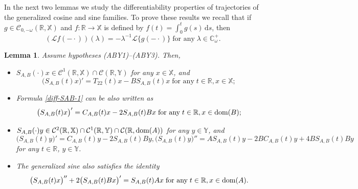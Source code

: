 \documentclass[11pt]{amsart}
\numberwithin{equation}{section}
\newcommand{\SAB}{S_{A,B}}
\newcommand{\CAB}{C_{A,B}}
\newcommand{\RR}{{\mathbb R}}
\newcommand{\CC}{{\mathbb C}}
\newcommand{\rmd}{{\mathrm{d}}}
\newtheorem{lemma}[theorem]{Lemma}
\theoremstyle{remark}
\theoremstyle{definition}
\newcommand\bX{{\mathbb X}}
\newcommand\bY{{\mathbb Y}}
\newcommand{\dom}{\text{\rm{dom}}}
\begin{document}
In the next two lemmas we study the differentiability properties of trajectories of the generalized cosine and sine families. To prove these results we recall
that if $g \in \mathcal{C}_{0,-\omega}(\mathbb{R},\bX)$ and $f : \mathbb{R} \to \bX$ is defined by $f(t) = \int_0^t g(s)\,\rmd s$, then
\begin{equation}\label{Laplace-pm}
	(\mathcal{L}f(-\cdot))(\lambda) = -\lambda^{-1}\mathcal{L}\{g(-\cdot)\}\;\mbox{for any}\;\lambda\in\CC_\omega^+.
\end{equation}
\begin{lemma}\label{l4.2}
	Assume hypotheses \textnormal{(ABY1)--(ABY3)}. Then,
	\begin{itemize}
		\item[(i)] $\SAB(\cdot)x \in \mathcal{C}^1(\mathbb{R},\bX) \cap \mathcal{C}(\mathbb{R},\bY)$ for any $x \in \bX$, and
		\begin{equation}\label{diff-SAB-1}
			\bigl(\SAB(t)x\bigr)' = T_{22}(t)x - B\SAB(t)x\;\mbox{for any}\; t\in\RR, x\in\bX;
		\end{equation}
		\item[(ii)] Formula \eqref{diff-SAB-1} can be also written as 
		\begin{equation}\label{diff-SAB-2}
			\bigl(\SAB(t)x\bigr)' = \CAB(t)x - 2\SAB(t)Bx \;\mbox{for any}\; t\in\RR, x\in\dom(B);
		\end{equation}
		\item[(iii)] $\SAB(\cdot)y \in \mathcal{C}^2(\mathbb{R},\bX) \cap \mathcal{C}^1(\mathbb{R},\bY) \cap \mathcal{C}(\mathbb{R},\dom(A))$ for any $y \in \bY$, and
		\begin{equation}\label{diff-SAB-3}
			\bigl(\SAB(t)y\bigr)' = \CAB(t)y - 2\SAB(t)By, 
			\bigl(\SAB(t)y\bigr)''= A\SAB(t)y - 2BC_{A,B}(t)y + 4B\SAB(t)By 
		\end{equation}
		for any $t \in \mathbb{R}$, $y \in \bY$.
		\item[(iv)] The generalized sine also satisfies the identity
		\begin{equation}\label{diff-SAB-4}
			\bigl(\SAB(t)x\bigr)'' + 2\bigl(\SAB(t)Bx\bigr)' = \SAB(t)Ax \;\mbox{for any}\; t\in\RR, x\in\dom(A).
		\end{equation}
	\end{itemize}
\end{lemma}
\end{document}
